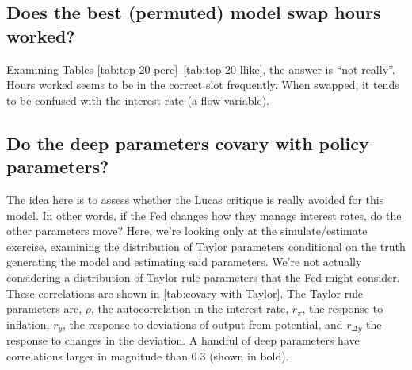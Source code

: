 \documentclass[11pt]{article}
\begin{document}
\hypertarget{does-the-best-permuted-model-swap-hours-worked}{%
\subsection{Does the best (permuted) model swap hours
worked?}\label{does-the-best-permuted-model-swap-hours-worked}}

Examining Tables \ref{tab:top-20-perc}--\ref{tab:top-20-llike}, the
answer is ``not really''. Hours worked seems to be in the correct slot
frequently. When swapped, it tends to be confused with the interest rate
(a flow variable).

\hypertarget{do-the-deep-parameters-covary-with-policy-parameters}{%
\subsection{Do the deep parameters covary with policy
parameters?}\label{do-the-deep-parameters-covary-with-policy-parameters}}

The idea here is to assess whether the Lucas critique is really avoided
for this model. In other words, if the Fed changes how they manage
interest rates, do the other parameters move? Here, we're looking only
at the simulate/estimate exercise, examining the distribution of Taylor
parameters conditional on the truth generating the model and estimating
said parameters. We're not actually considering a distribution of Taylor
rule parameters that the Fed might consider. These correlations are
shown in \autoref{tab:covary-with-Taylor}. The Taylor rule parameters
are, \(\rho\), the autocorrelation in the interest rate, \(r_\pi\), the
response to inflation, \(r_y\), the response to deviations of output
from potential, and \(r_{\Delta y}\) the response to changes in the
deviation. A handful of deep parameters have correlations larger in
magnitude than 0.3 (shown in bold).
\end{document}
